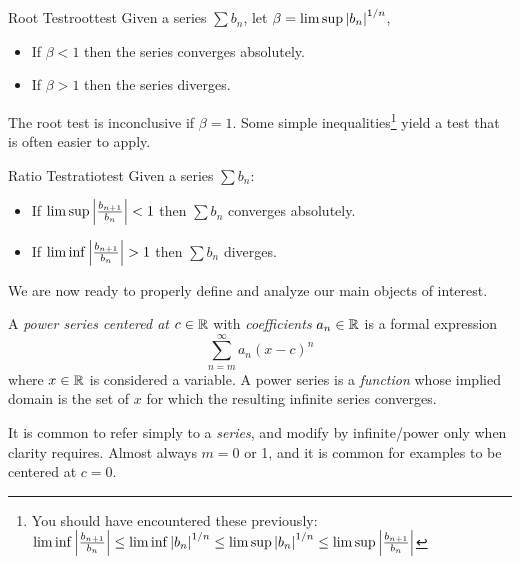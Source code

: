 \begin{thm}{Root Test}{roottest}
	Given a series $\sum b_n$, let $\beta=\limsup\left| b_n\right|^{1/n}$,
	\begin{itemize}%
	  \item If $\beta<1$ then the series converges absolutely.
	  \item If $\beta>1$ then the series diverges.
	\end{itemize}
\end{thm}

\goodbreak


The root test is inconclusive if $\beta=1$. Some simple inequalities\footnote{%
	You should have encountered these previously: $\liminf\left| \frac{b_{n+1}}{b_n}\right|\le \liminf\left| b_n\right|^{1/n}\le \limsup\left| b_n\right|^{1/n} \le\limsup\left| \frac{b_{n+1}}{b_n}\right|$%
}
yield a test that is often easier to apply.

\begin{cor}{Ratio Test}{ratiotest}
	Given a series $\sum b_n$:
	\begin{itemize}\itemsep0pt
	  \item If $\limsup\left| \frac{b_{n+1}}{b_n}\right|<1$ then $\sum b_n$ converges absolutely.
	  \item If $\liminf\nm{\frac{b_{n+1}}{b_n}}>1$ then $\sum b_n$ diverges.
	\end{itemize}
\end{cor}

We are now ready to properly define and analyze our main objects of interest.

\begin{defn}{}{}
	A \emph{power series centered at $c\in\mathbb{R}$} with \emph{coefficients} $a_n\in\mathbb{R}$ is a formal expression
	\[
		\sum_{n=m}^\infty a_n(x-c)^n
	\]
	where $x\in\mathbb{R}$ is considered a variable. A power series is a \emph{function} whose implied domain is the set of $x$ for which the resulting infinite series converges. 
\end{defn}

It is common to refer simply to a \emph{series}, and modify by infinite/power only when clarity requires. Almost always $m=0$ or 1, and it is common for examples to be centered at $c=0$.


